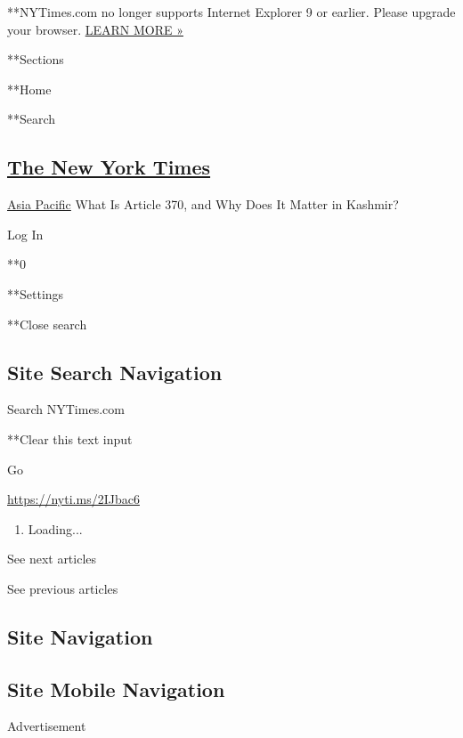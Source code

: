  **NYTimes.com no longer supports Internet Explorer 9 or earlier. Please
upgrade your browser.
\href{http://www.nytimes.com/content/help/site/ie9-support.html}{LEARN
MORE »}

**Sections

**Home

**Search

\hypertarget{the-new-york-times}{%
\subsection{\texorpdfstring{\href{http://www.nytimes.com/}{The New York
Times}}{The New York Times}}\label{the-new-york-times}}

 \href{/section/world/asia}{Asia Pacific} \textbar{}What Is Article 370,
and Why Does It Matter in Kashmir?

Log In

**0

**Settings

**Close search

\hypertarget{site-search-navigation}{%
\subsection{Site Search Navigation}\label{site-search-navigation}}

Search NYTimes.com

**Clear this text input

Go

\url{https://nyti.ms/2IJbac6}

\begin{enumerate}
\def\labelenumi{\arabic{enumi}.}
\item
  Loading...
\end{enumerate}

See next articles

See previous articles

\hypertarget{site-navigation}{%
\subsection{Site Navigation}\label{site-navigation}}

\hypertarget{site-mobile-navigation}{%
\subsection{Site Mobile Navigation}\label{site-mobile-navigation}}

Advertisement

